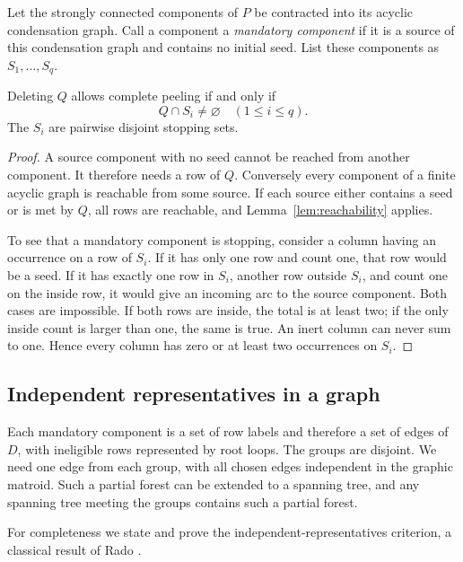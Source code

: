 Let the strongly connected components of $P$ be contracted into its
acyclic condensation graph.  Call a component a \emph{mandatory component}
if it is a source of this condensation graph and contains no initial seed.
List these components as $S_1,\ldots,S_q$.

\begin{lemma}\label{lem:mandatory}
Deleting $Q$ allows complete peeling if and only if
\[
                        Q\cap S_i\ne\varnothing
                           \quad(1\leq i\leq q).
\]
The $S_i$ are pairwise disjoint stopping sets.
\end{lemma}
\begin{proof}
A source component with no seed cannot be reached from another component.
It therefore needs a row of $Q$.  Conversely every component of a finite
acyclic graph is reachable from some source.  If each source either contains
a seed or is met by $Q$, all rows are reachable, and
Lemma~\ref{lem:reachability} applies.

To see that a mandatory component is stopping, consider a column having
an occurrence on a row of $S_i$.  If it has only one row and count one,
that row would be a seed.  If it has exactly one row in $S_i$, another row
outside $S_i$, and count one on the inside row, it would give an incoming
arc to the source component.  Both cases are impossible.  If both rows
are inside, the total is at least two; if the only inside count is larger
than one, the same is true.  An inert column can never sum to one.
Hence every column has zero or at least two
occurrences on $S_i$.
\end{proof}

\subsection{Independent representatives in a graph}
Each mandatory component is a set of row labels and therefore a set of
edges of $D$, with ineligible rows represented by root loops.  The groups
are disjoint.  We need one edge from each group,
with all chosen edges independent in the graphic matroid.  Such a partial
forest can be extended to a spanning tree, and any spanning tree meeting
the groups contains such a partial forest.

For completeness we state and prove the independent-representatives
criterion, a classical result of Rado \cite{Rado1942}.

